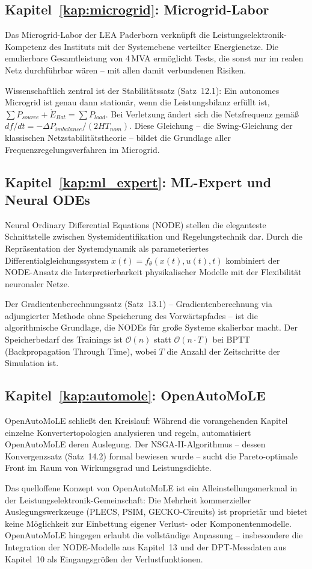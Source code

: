 ﻿\documentclass[a4paper,12pt,openany,oneside]{book}
\newcommand{\unterabschnitt}[1]{\subsection{#1}}
\theoremstyle{definition}
\begin{document}
\unterabschnitt{Kapitel~\ref{kap:microgrid}: Microgrid-Labor}

Das Microgrid-Labor der LEA Paderborn verkn\"upft die Leistungselektronik-Kompetenz
des Instituts mit der Systemebene verteilter Energienetze. Die emulierbare
Gesamtleistung von 4\,MVA erm\"oglicht Tests, die sonst nur im realen Netz durchf\"uhrbar
w\"aren -- mit allen damit verbundenen Risiken.

Wissenschaftlich zentral ist der Stabilit\"atssatz (Satz~12.1): Ein autonomes Microgrid
ist genau dann station\"ar, wenn die Leistungsbilanz erf\"ullt ist,
$\sum P_{source} + \dot{E}_{Bat} = \sum P_{load}$. Bei Verletzung \"andert sich die
Netzfrequenz gem\"a\ss{} $df/dt = -\Delta P_{imbalance}/(2H T_{nom})$. Diese
Gleichung -- die Swing-Gleichung der klassischen Netzstabilit\"atstheorie -- bildet
die Grundlage aller Frequenzregelungsverfahren im Microgrid.

\unterabschnitt{Kapitel~\ref{kap:ml_expert}: ML-Expert und Neural ODEs}

Neural Ordinary Differential Equations (NODE) stellen die eleganteste Schnittstelle
zwischen Systemidentifikation und Regelungstechnik dar. Durch die Repr\"asentation
der Systemdynamik als parameteriertes Differentialgleichungssystem
$\dot{x}(t) = f_\theta(x(t), u(t), t)$ kombiniert der NODE-Ansatz die Interpretierbarkeit
physikalischer Modelle mit der Flexibilit\"at neuronaler Netze.

Der Gradientenberechnungssatz (Satz~13.1) -- Gradientenberechnung via adjungierter
Methode ohne Speicherung des Vorw\"artspfades -- ist die algorithmische Grundlage,
die NODEs f\"ur gro\ss{}e Systeme skalierbar macht. Der Speicherbedarf des Trainings
ist $\mathcal{O}(n)$ statt $\mathcal{O}(n \cdot T)$ bei BPTT (Backpropagation Through
Time), wobei $T$ die Anzahl der Zeitschritte der Simulation ist.

\unterabschnitt{Kapitel~\ref{kap:automole}: OpenAutoMoLE}

OpenAutoMoLE schlie\ss{}t den Kreislauf: W\"ahrend die vorangehenden Kapitel
einzelne Konvertertopologien analysieren und regeln, automatisiert OpenAutoMoLE
deren Auslegung. Der NSGA-II-Algorithmus -- dessen Konvergenzsatz (Satz~14.2) formal
bewiesen wurde -- sucht die Pareto-optimale Front im Raum von Wirkungsgrad und
Leistungsdichte.

Das quelloffene Konzept von OpenAutoMoLE ist ein Alleinstellungsmerkmal in der
Leistungselektronik-Gemeinschaft: Die Mehrheit kommerzieller Auslegungswerkzeuge
(PLECS, PSIM, GECKO-Circuits) ist propriet\"ar und bietet keine M\"oglichkeit zur
Einbettung eigener Verlust- oder Komponentenmodelle. OpenAutoMoLE hingegen erlaubt
die vollst\"andige Anpassung -- insbesondere die Integration der NODE-Modelle aus
Kapitel~13 und der DPT-Messdaten aus Kapitel~10 als Eingangsgr\"o\ss{}en der
Verlustfunktionen.
\end{document}
